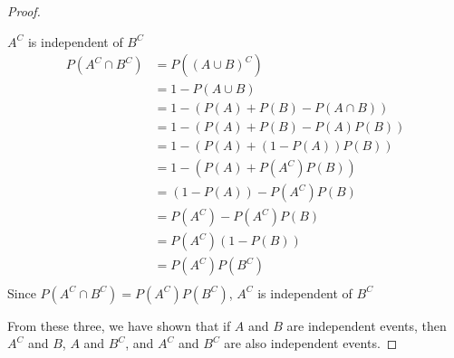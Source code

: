 \documentclass[12pt,letterpaper]{article}
\begin{document}
\begin{enumerate}
\begin{enumerate}
\begin{proof}
\begin{itemize}
                $A^C$ is independent of $B^C$
                \begin{align*}
                  P\left(A^C \cap B^C\right) &= P\left(\left(A \cup B\right)^C\right) \\
                  &= 1 - P\left(A \cup B\right) \\
                  &= 1 - \left(P\left(A\right) + P\left(B\right) - P\left(A \cap B\right)\right) \\
                  &= 1 - \left(P\left(A\right) + P\left(B\right) - P\left(A\right)P\left(B\right)\right) \\
                  &= 1 - \left(P\left(A\right) + \left(1 - P\left(A\right)\right)P\left(B\right)\right) \\
                  &= 1 - \left(P\left(A\right) + P\left(A^C\right)P\left(B\right)\right) \\
                  &= \left(1 - P\left(A\right)\right) - P\left(A^C\right)P\left(B\right) \\
                  &= P\left(A^C\right) - P\left(A^C\right)P\left(B\right) \\
                  &= P\left(A^C\right)\left(1 - P\left(B\right)\right) \\
                  &= P\left(A^C\right)P\left(B^C\right) \\
                \end{align*}
                Since $P\left(A^C \cap B^C\right) = P\left(A^C\right)P\left(B^C\right)$, $A^C$ is independent of $B^C$
            \end{itemize}

            From these three, we have shown that
            if $A$ and $B$ are independent events,
            then $A^C$ and $B$, $A$ and $B^C$, and $A^C$ and $B^C$ are also independent events.
          \end{proof}
      \end{enumerate}
  \end{enumerate}
\end{document}
